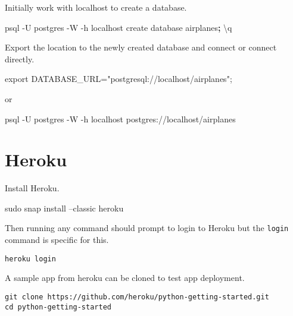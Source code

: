 \documentclass[]{book}
\newenvironment{Shaded}{\begin{snugshade}}{\end{snugshade}}
\newcommand{\BuiltInTok}[1]{#1}
\newcommand{\ExtensionTok}[1]{#1}
\newcommand{\FunctionTok}[1]{\textcolor[rgb]{0.00,0.00,0.00}{#1}}
\newcommand{\KeywordTok}[1]{\textcolor[rgb]{0.13,0.29,0.53}{\textbf{#1}}}
\newcommand{\NormalTok}[1]{#1}
\newcommand{\StringTok}[1]{\textcolor[rgb]{0.31,0.60,0.02}{#1}}
\newcommand{\VariableTok}[1]{\textcolor[rgb]{0.00,0.00,0.00}{#1}}
\begin{document}
Initially work with localhost to create a database.

\begin{Shaded}
\begin{Highlighting}[]
\ExtensionTok{psql}\NormalTok{ -U postgres -W  -h localhost}
\ExtensionTok{create}\NormalTok{ database airplanes}\KeywordTok{;}
\NormalTok{\textbackslash{}}\ExtensionTok{q}
\end{Highlighting}
\end{Shaded}

Export the location to the newly created database and connect or connect directly.

\begin{Shaded}
\begin{Highlighting}[]
\BuiltInTok{export} \VariableTok{DATABASE_URL=}\StringTok{"postgresql://localhost/airplanes"}\NormalTok{;}
\end{Highlighting}
\end{Shaded}

or

\begin{Shaded}
\begin{Highlighting}[]
\ExtensionTok{psql}\NormalTok{ -U postgres -W  -h localhost postgres://localhost/airplanes}
\end{Highlighting}
\end{Shaded}

\hypertarget{heroku}{%
\section{Heroku}\label{heroku}}

Install Heroku.

\begin{Shaded}
\begin{Highlighting}[]
\FunctionTok{sudo}\NormalTok{ snap install --classic heroku}
\end{Highlighting}
\end{Shaded}

Then running any command should prompt to login to Heroku but the \texttt{login} command is specific for this.

\begin{verbatim}
heroku login
\end{verbatim}

A sample app from heroku can be cloned to test app deployment.

\begin{verbatim}
git clone https://github.com/heroku/python-getting-started.git
cd python-getting-started
\end{verbatim}
\end{document}
